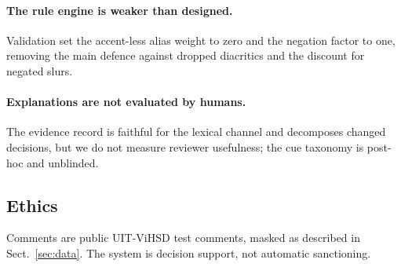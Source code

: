\paragraph{The rule engine is weaker than designed.}
Validation set the accent-less alias weight to zero and the negation factor to one,
removing the main defence against dropped diacritics and the discount for negated slurs.

\paragraph{Explanations are not evaluated by humans.}
The evidence record is faithful for the lexical channel and decomposes changed
decisions, but we do not measure reviewer usefulness; the cue taxonomy is post-hoc
and unblinded.

\subsection{Ethics}

\label{sec:ethics}

Comments are public UIT-ViHSD test comments, masked as described in Sect.~\ref{sec:data}.
The system is decision support, not automatic sanctioning.